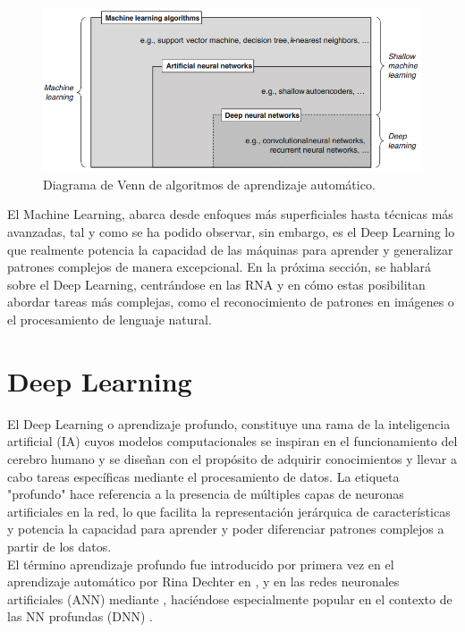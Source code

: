  \begin{figure} [h!]
    \begin{center}
      \includegraphics[width=12cm]{figs/Algoritmos de ML.png}
    \end{center}
    \caption{Diagrama de Venn de algoritmos de aprendizaje automático.}
    \label{fig:AlgoritmosML}
\end{figure}

El Machine Learning, abarca desde enfoques más superficiales hasta técnicas más avanzadas, tal y como se ha podido observar, sin embargo, es el Deep Learning lo que realmente potencia la capacidad de las máquinas para aprender y generalizar patrones complejos de manera excepcional. En la próxima sección, se hablará sobre el Deep Learning, centrándose en las RNA y en cómo estas posibilitan abordar tareas más complejas, como el reconocimiento de patrones en imágenes o el procesamiento de lenguaje natural.\\

\section{Deep Learning}
\label{sec:DeepLearning} 
El Deep Learning o aprendizaje profundo, constituye una rama de la inteligencia artificial (IA) cuyos modelos computacionales se inspiran en el funcionamiento del cerebro humano y se diseñan con el propósito de adquirir conocimientos y llevar a cabo tareas específicas mediante el procesamiento de datos. La etiqueta "profundo" hace referencia a la presencia de múltiples capas de neuronas artificiales en la red, lo que facilita la representación jerárquica de características y potencia la capacidad para aprender y poder diferenciar patrones complejos a partir de los datos.\\

El término aprendizaje profundo fue introducido por primera vez en el aprendizaje automático por Rina Dechter en \cite{Dechter86}, y en las redes neuronales artificiales (ANN) mediante \cite{Aizenberg00}, haciéndose especialmente popular en el contexto de las NN profundas (DNN) \cite{Schmidhuber15}.\\

